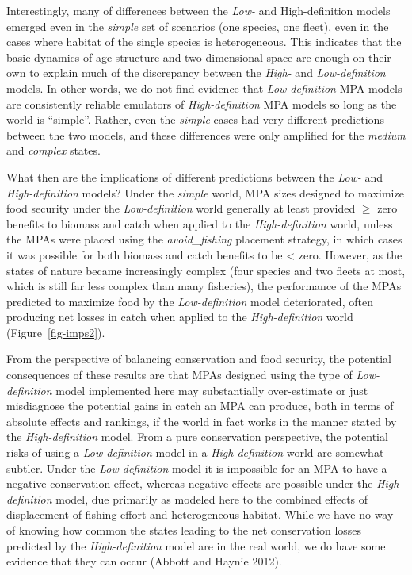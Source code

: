 \documentclass[
  default,
  lineno,
  referee]{sn-jnl}
\begin{document}
Interestingly, many of differences between the \emph{Low-} and
High-definition models emerged even in the \emph{simple} set of
scenarios (one species, one fleet), even in the cases where habitat of
the single species is heterogeneous. This indicates that the basic
dynamics of age-structure and two-dimensional space are enough on their
own to explain much of the discrepancy between the \emph{High-} and
\emph{Low-definition} models. In other words, we do not find evidence
that \emph{Low-definition} MPA models are consistently reliable
emulators of \emph{High-definition} MPA models so long as the world is
``simple''. Rather, even the \emph{simple} cases had very different
predictions between the two models, and these differences were only
amplified for the \emph{medium} and \emph{complex} states.

What then are the implications of different predictions between the
\emph{Low-} and \emph{High-definition} models? Under the \emph{simple}
world, MPA sizes designed to maximize food security under the
\emph{Low-definition} world generally at least provided \(\geq\) zero
benefits to biomass and catch when applied to the \emph{High-definition}
world, unless the MPAs were placed using the \emph{avoid\_fishing}
placement strategy, in which cases it was possible for both biomass and
catch benefits to be \textless{} zero. However, as the states of nature
became increasingly complex (four species and two fleets at most, which
is still far less complex than many fisheries), the performance of the
MPAs predicted to maximize food by the \emph{Low-definition} model
deteriorated, often producing net losses in catch when applied to the
\emph{High-definition} world (Figure~\ref{fig-imps2}).

From the perspective of balancing conservation and food security, the
potential consequences of these results are that MPAs designed using the
type of \emph{Low-definition} model implemented here may substantially
over-estimate or just misdiagnose the potential gains in catch an MPA
can produce, both in terms of absolute effects and rankings, if the
world in fact works in the manner stated by the \emph{High-definition}
model. From a pure conservation perspective, the potential risks of
using a \emph{Low-definition} model in a \emph{High-definition} world
are somewhat subtler. Under the \emph{Low-definition} model it is
impossible for an MPA to have a negative conservation effect, whereas
negative effects are possible under the \emph{High-definition} model,
due primarily as modeled here to the combined effects of displacement of
fishing effort and heterogeneous habitat. While we have no way of
knowing how common the states leading to the net conservation losses
predicted by the \emph{High-definition} model are in the real world, we
do have some evidence that they can occur (Abbott and Haynie 2012).
\end{document}
